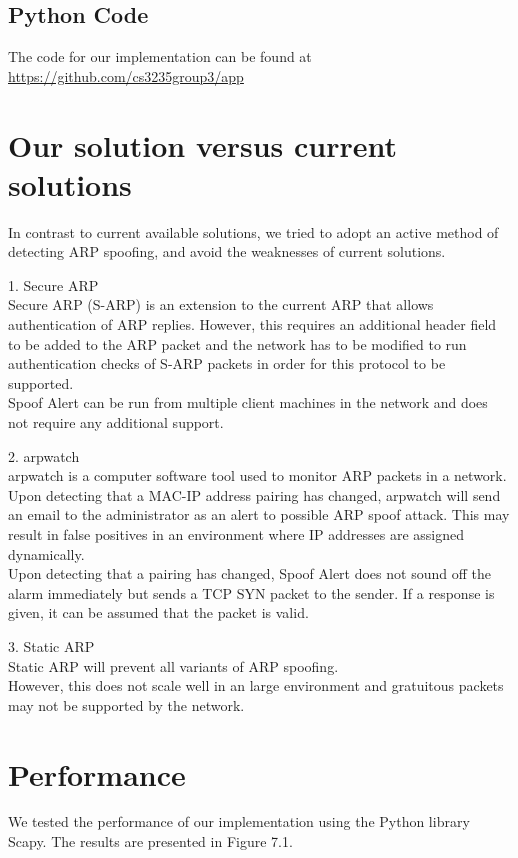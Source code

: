\documentclass{acm_proc_article-sp}
\begin{document}
\subsection{Python Code}
The code for our implementation can be found at \\
\url{https://github.com/cs3235group3/app}

\section{Our solution versus current \\solutions}
In contrast to current available solutions, we tried to adopt an active method of detecting ARP spoofing, and avoid the weaknesses of current solutions.  

1. Secure ARP\\
Secure ARP (S-ARP) is an extension to the current ARP that allows authentication of ARP replies. However, this requires an additional header field to be added to the ARP packet and the network has to be modified to run authentication checks of S-ARP packets in order for this protocol to be supported. \\
Spoof Alert can be run from multiple client machines in the network and does not require any additional support.

2. arpwatch \\
arpwatch is a computer software tool used to monitor ARP packets in a network. Upon detecting that a MAC-IP address pairing has changed, arpwatch will send an email to the administrator as an alert to possible ARP spoof attack. This may result in false positives in an environment where IP addresses are assigned dynamically. \\
Upon detecting that a pairing has changed, Spoof Alert does not sound off the alarm immediately but sends a TCP SYN packet to the sender. If a response is given, it can be assumed that the packet is valid.

3. Static ARP \\ 
Static ARP will prevent all variants of ARP spoofing. \\
However, this does not scale well in an large environment and gratuitous packets may not be supported by the network.

\section{Performance}
We tested the performance of our implementation using the Python library Scapy. The results are presented in Figure 7.1.
\end{document}
